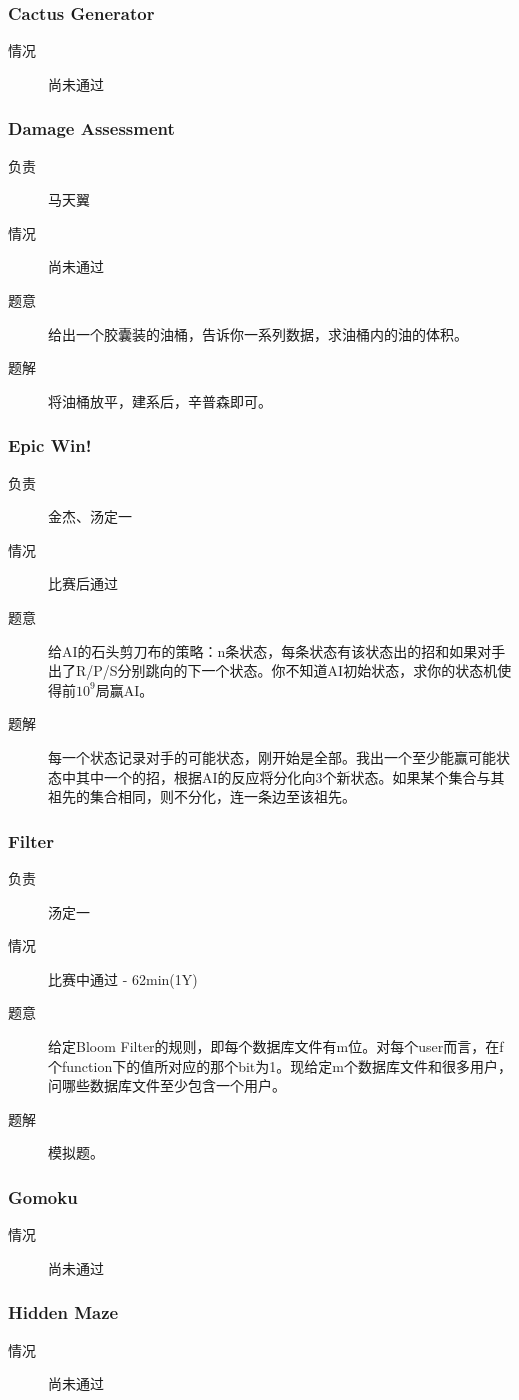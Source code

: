 \documentclass[a4paper, 11pt, nofonts, nocap, fancyhdr]{ctexart}
\newcommand{\problem}[1]{\subsubsection{#1}}
\begin{document}
\problem{Cactus Generator}

\begin{description}
\item[情况] 尚未通过
\end{description}

\problem{Damage Assessment}

\begin{description}
\item[负责] 马天翼
\item[情况] 尚未通过
\item[题意]
给出一个胶囊装的油桶，告诉你一系列数据，求油桶内的油的体积。
\item[题解]
将油桶放平，建系后，辛普森即可。
\end{description}

\problem{Epic Win!}

\begin{description}
\item[负责] 金杰、汤定一
\item[情况] 比赛后通过
\item[题意]
给AI的石头剪刀布的策略：n条状态，每条状态有该状态出的招和如果对手出了R/P/S分别跳向的下一个状态。你不知道AI初始状态，求你的状态机使得前$10^9$局赢AI。
\item[题解]
每一个状态记录对手的可能状态，刚开始是全部。我出一个至少能赢可能状态中其中一个的招，根据AI的反应将分化向3个新状态。如果某个集合与其祖先的集合相同，则不分化，连一条边至该祖先。
\end{description}

\problem{Filter}

\begin{description}
\item[负责] 汤定一
\item[情况] 比赛中通过 - 62min(1Y)
\item[题意]
给定Bloom Filter的规则，即每个数据库文件有m位。对每个user而言，在f个function下的值所对应的那个bit为1。现给定m个数据库文件和很多用户，问哪些数据库文件至少包含一个用户。
\item[题解]
模拟题。
\end{description}

\problem{Gomoku}

\begin{description}
\item[情况] 尚未通过
\end{description}

\problem{Hidden Maze}

\begin{description}
\item[情况] 尚未通过
\end{description}
\end{document}
